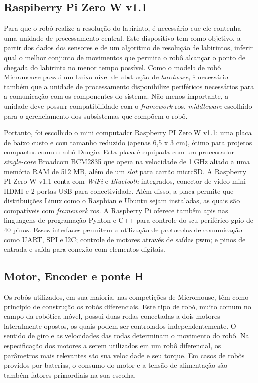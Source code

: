 \subsection{Raspiberry Pi Zero W v1.1}
\label{ssec:raspiberry_pi_zero}
Para que o robô realize a resolução do labirinto, é necessário que ele contenha uma unidade de processamento central. Este dispositivo tem como objetivo, a partir dos dados dos sensores e de um algoritmo de resolução de labirintos, inferir qual o melhor conjunto de movimentos que permita o robô alcançar o ponto de chegada do labirinto no menor tempo possível. Como o modelo de robô Micromouse possui um baixo nível de abstração de \textit{hardware}, é necessário também que a unidade de processamento disponibilize periféricos necessários para a comunicação com os componentes do sistema. Não menos importante, a unidade deve possuir compatibilidade com o \textit{framework} \gls*{ros}, \textit{middleware }escolhido para o gerenciamento dos subsistemas que compõem o robô.

Portanto, foi escolhido o mini computador Raspberry PI Zero W v1.1: uma placa de baixo custo e com tamanho reduzido (apenas 6,5 x 3 cm), ótimo para projetos compactos como o robô Doogie. Esta placa é equipada com um processador \textit{single-core} Broadcom BCM2835 que opera na velocidade de 1 GHz aliado a uma memória RAM de 512 MB, além de um \textit{slot} para cartão microSD. A Raspberry PI Zero W v1.1 conta com \textit{WiFi} e \textit{Bluetooth} integrados, conector de vídeo mini HDMI e 2 portas USB para conectividade. Além disso, a placa permite que distribuições Linux como o Raspbian e Ubuntu sejam instaladas, as quais são compatíveis com \textit{framework} \gls*{ros}. A Raspberry Pi oferece também \glspl*{api} nas linguagens de programação Pyhton e C++ para controle do seu periférico \gls*{gpio} de 40 pinos. Essas interfaces permitem a utilização de protocolos de comunicação como UART, SPI e I2C; controle de motores através de saídas \gls*{pwm}; e pinos de entrada e saída para conexão com elementos digitais.

\subsection{Motor, Encoder e ponte H}
\label{ssec:motor_encoder_ponte-h}
Os robôs utilizados, em sua maioria, nas competições de Micromouse, têm como princípio de construção os robôs diferenciais. Este tipo de robô, muito comum no campo da robótica móvel, possui duas rodas conectadas a dois motores lateralmente opostos, os quais podem ser controlados independentemente. O sentido de giro e as velocidades das rodas determinam  o movimento do robô. Na especificação dos motores a serem utilizados em um robô diferencial, os parâmetros mais relevantes são sua velocidade e seu torque. Em casos de robôs providos por baterias, o consumo do motor e a tensão de alimentação são também fatores primordiais na sua escolha.

